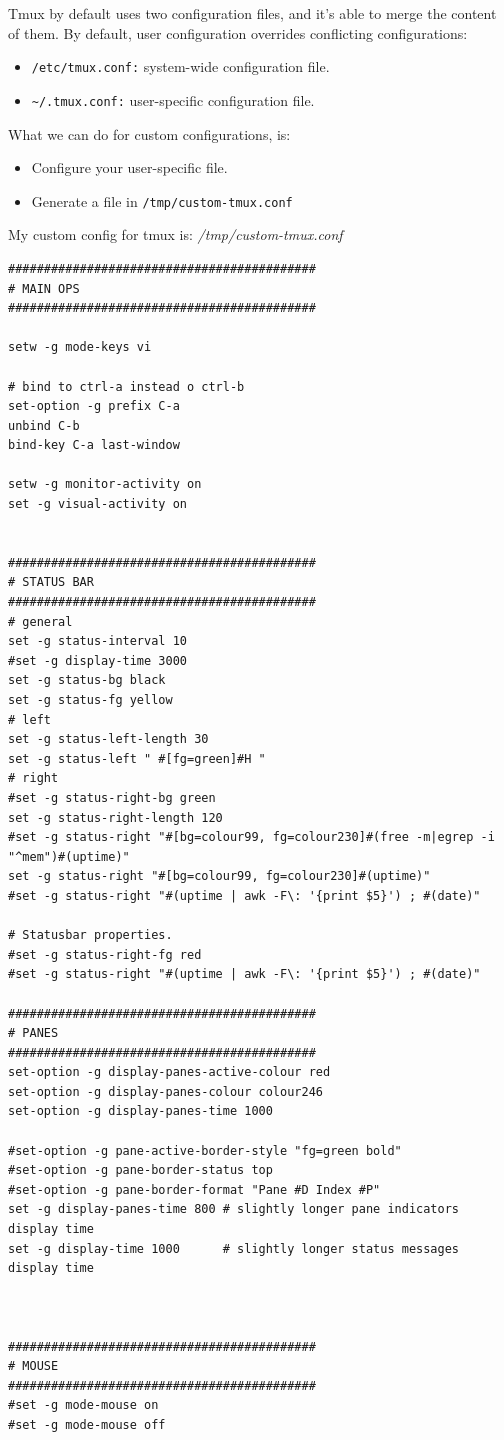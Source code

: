 \documentclass{article}
\newenvironment{codetemplate}[1][]{%
  \mybasecolorbox[#1]
  \itshape
}{%
  \endmybasecolorbox
}
\begin{document}
Tmux by default uses two configuration files, and it's able to merge the content of them. By default, user configuration overrides conflicting configurations:
\begin{itemize}
    \item \verb|/etc/tmux.conf:| system-wide configuration file.
    \item \verb|~/.tmux.conf:| user-specific configuration file.
\end{itemize}

What we can do for custom configurations, is:
\begin{itemize}
    \item Configure your user-specific file.
    \item Generate a file in \verb|/tmp/custom-tmux.conf|
\end{itemize}

My custom config for tmux is:
\begin{codetemplate}{/tmp/custom-tmux.conf}
\begin{verbatim}
###########################################
# MAIN OPS
###########################################

setw -g mode-keys vi

# bind to ctrl-a instead o ctrl-b
set-option -g prefix C-a
unbind C-b
bind-key C-a last-window

setw -g monitor-activity on
set -g visual-activity on


###########################################
# STATUS BAR
###########################################
# general
set -g status-interval 10
#set -g display-time 3000
set -g status-bg black
set -g status-fg yellow
# left
set -g status-left-length 30
set -g status-left " #[fg=green]#H "
# right
#set -g status-right-bg green
set -g status-right-length 120
#set -g status-right "#[bg=colour99, fg=colour230]#(free -m|egrep -i "^mem")#(uptime)"
set -g status-right "#[bg=colour99, fg=colour230]#(uptime)"
#set -g status-right "#(uptime | awk -F\: '{print $5}') ; #(date)"

# Statusbar properties.
#set -g status-right-fg red
#set -g status-right "#(uptime | awk -F\: '{print $5}') ; #(date)"

###########################################
# PANES
###########################################
set-option -g display-panes-active-colour red
set-option -g display-panes-colour colour246
set-option -g display-panes-time 1000

#set-option -g pane-active-border-style "fg=green bold"
#set-option -g pane-border-status top
#set-option -g pane-border-format "Pane #D Index #P"
set -g display-panes-time 800 # slightly longer pane indicators display time
set -g display-time 1000      # slightly longer status messages display time



###########################################
# MOUSE
###########################################
#set -g mode-mouse on
#set -g mode-mouse off
\end{verbatim}
\end{codetemplate}
\end{document}
